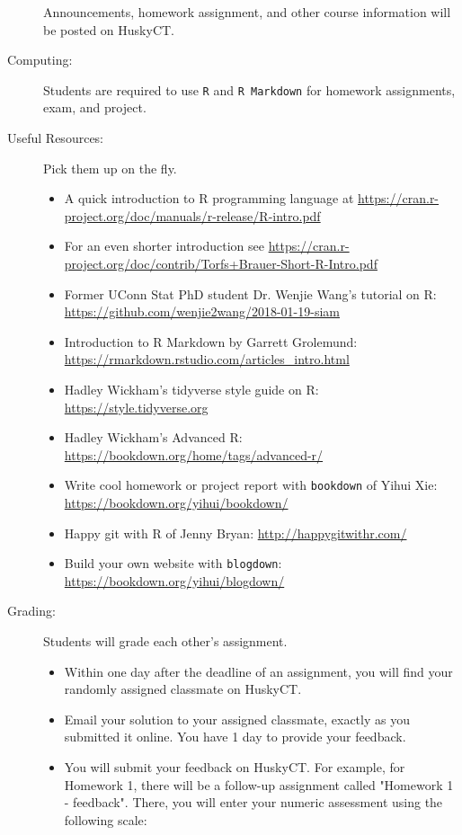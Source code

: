 \documentclass[twocolumn]{article}
\begin{document}
\begin{description}
Announcements, homework assignment, and other course
information will be posted on HuskyCT.

\item[Computing:]
  Students are required to use \texttt{R} and \texttt{R Markdown}
  for homework assignments, exam, and project.

\item[Useful Resources:] Pick them up on the fly.
\begin{itemize}[noitemsep]
\item
A quick introduction to R programming language at
\url{https://cran.r-project.org/doc/manuals/r-release/R-intro.pdf}
\item
For an even shorter introduction see
\url{https://cran.r-project.org/doc/contrib/Torfs+Brauer-Short-R-Intro.pdf}
\item
Former UConn Stat PhD student Dr. Wenjie Wang's tutorial on R:
\url{https://github.com/wenjie2wang/2018-01-19-siam}
\item
Introduction to R Markdown by Garrett Grolemund:
\url{https://rmarkdown.rstudio.com/articles_intro.html}
\item
Hadley Wickham's tidyverse style guide on R:
\url{https://style.tidyverse.org}
\item
Hadley Wickham's Advanced R:
\url{https://bookdown.org/home/tags/advanced-r/}
\item
Write cool homework or project report with \texttt{bookdown} of Yihui Xie:
\url{https://bookdown.org/yihui/bookdown/}
\item
Happy git with R of Jenny Bryan:
\url{http://happygitwithr.com/}
\item
Build your own website with \texttt{blogdown}:
\url{https://bookdown.org/yihui/blogdown/}
\end{itemize}

\item[Grading:] Students will grade each other's assignment.

\begin{itemize}
\item
  Within one day after the deadline of an assignment, you will find your
randomly assigned classmate on HuskyCT.

\item
Email your solution to your assigned classmate, exactly as you
submitted it online. You have 1 day to provide your feedback. 

\item
You will submit your feedback on HuskyCT. For example, for Homework
1, there will be a follow-up assignment called "Homework 1 -
feedback". There, you will enter your numeric assessment using the
following scale:


\end{itemize}
\end{description}
\end{document}
